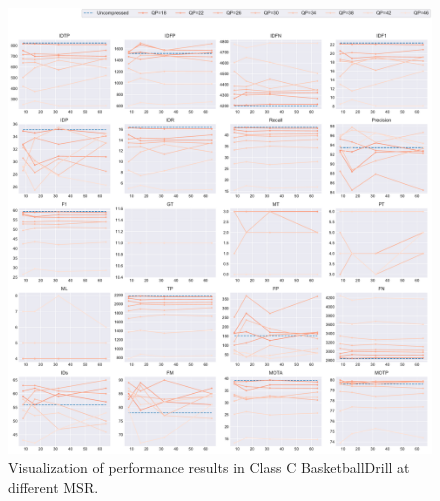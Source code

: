 \begin{figure}[!htbp]
\centering
\includegraphics[width=1.0\linewidth]{img/appendix/BasketballDrill_all_multiplots_msr.pdf}
\caption[Visualization of performance results in Class C BasketballDrill at different MSR]
{Visualization of performance results in Class C BasketballDrill at different MSR.}
\label{fig:BasketballDrill_all_msr}
\end{figure}



